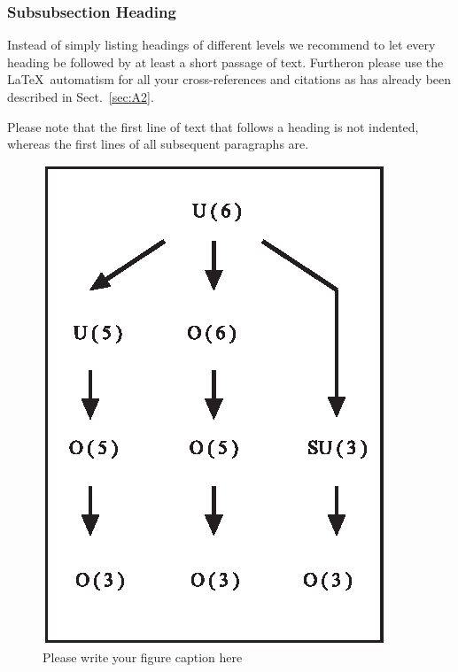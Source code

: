 \documentclass[graybox,envcountchap,sectrefs]{svmono}
\begin{document}
\subsubsection{Subsubsection Heading}
Instead of simply listing headings of different levels we recommend to let every heading be followed by at least a short passage of text. Furtheron please use the \LaTeX\ automatism for all your cross-references and citations as has already been described in Sect.~\ref{sec:A2}.

Please note that the first line of text that follows a heading is not indented, whereas the first lines of all subsequent paragraphs are.

%
\begin{figure}[t]
	\sidecaption[t]
	\includegraphics[scale=.65]{img/figure}
	\caption{Please write your figure caption here}
	\label{fig:A1}       %
\end{figure}
\end{document}
